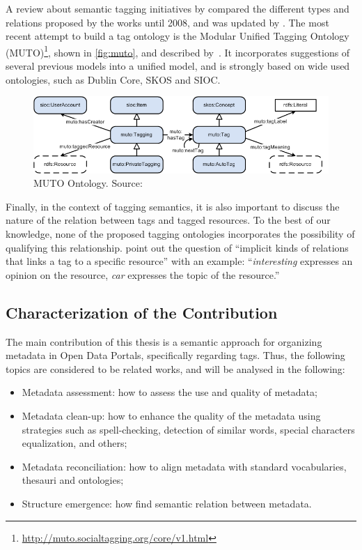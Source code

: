 A review about semantic tagging initiatives by  compared the different types and relations proposed by the works until 2008, and was updated by .
The most recent attempt to build a tag ontology is the Modular Unified Tagging Ontology (MUTO)\footnote{\url{http://muto.socialtagging.org/core/v1.html}}, shown in \autoref{fig:muto}, and described by~.
It incorporates suggestions of several previous models into a unified model, and is strongly based on wide used ontologies, such as Dublin Core, SKOS and SIOC. 

\begin{figure}[b]
\begin{center}
\includegraphics[width=\columnwidth]{images/muto.png}
\caption[MUTO Ontology.]{MUTO Ontology. Source: }
\label{fig:muto}
\end{center}
\end{figure}

Finally, in the context of tagging semantics, it is also important to discuss the nature of the relation between tags and tagged resources.
To the best of our knowledge, none of the proposed tagging ontologies incorporates the possibility of qualifying this relationship.
 point out the question of ``implicit kinds of relations that links a tag to a specific resource'' with an example: ``\emph{interesting} expresses an opinion on the resource, \emph{car} expresses the topic of the resource.''

\subsection{Characterization of the Contribution}

The main contribution of this thesis is a semantic approach for organizing metadata in Open Data Portals, specifically regarding tags.
Thus, the following topics are considered to be related works, and will be analysed in the following:
\begin{itemize}
	\item Metadata assessment: how to assess the use and quality of metadata;
	\item Metadata clean-up: how to enhance the quality of the metadata using strategies such as spell-checking, detection of similar words, special characters equalization, and others;
	\item Metadata reconciliation: how to align metadata with standard vocabularies, thesauri and ontologies;
	\item Structure emergence: how find semantic relation between metadata.
\end{itemize}

